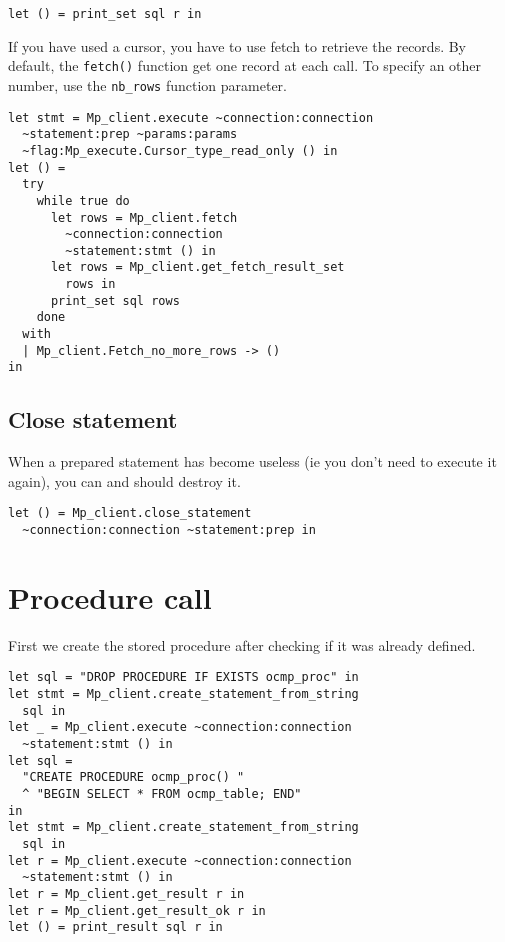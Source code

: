 \documentclass[a4paper, english, 11pt]{article}
\begin{document}
\begin{verbatim}
let () = print_set sql r in 
\end{verbatim}

If you have used a cursor, you have to use fetch to retrieve the records. By default, the \texttt{fetch()} function get one record at each call. To specify an other number, use the \texttt{nb\_rows} function parameter.

\begin{verbatim}
let stmt = Mp_client.execute ~connection:connection 
  ~statement:prep ~params:params 
  ~flag:Mp_execute.Cursor_type_read_only () in
let () = 
  try
    while true do
      let rows = Mp_client.fetch
        ~connection:connection 
        ~statement:stmt () in
      let rows = Mp_client.get_fetch_result_set
        rows in
      print_set sql rows
    done
  with
  | Mp_client.Fetch_no_more_rows -> ()
in
\end{verbatim}

\subsection{Close statement}

When a prepared statement has become useless (ie you don't need to execute it again), you can and should destroy it.

\begin{verbatim}
let () = Mp_client.close_statement 
  ~connection:connection ~statement:prep in
\end{verbatim}

\section{Procedure call}

First we create the stored procedure after checking if it was already defined.

\begin{verbatim}
let sql = "DROP PROCEDURE IF EXISTS ocmp_proc" in
let stmt = Mp_client.create_statement_from_string 
  sql in
let _ = Mp_client.execute ~connection:connection 
  ~statement:stmt () in 
let sql = 
  "CREATE PROCEDURE ocmp_proc() "
  ^ "BEGIN SELECT * FROM ocmp_table; END"
in
let stmt = Mp_client.create_statement_from_string 
  sql in
let r = Mp_client.execute ~connection:connection 
  ~statement:stmt () in
let r = Mp_client.get_result r in
let r = Mp_client.get_result_ok r in
let () = print_result sql r in
\end{verbatim}
\end{document}
